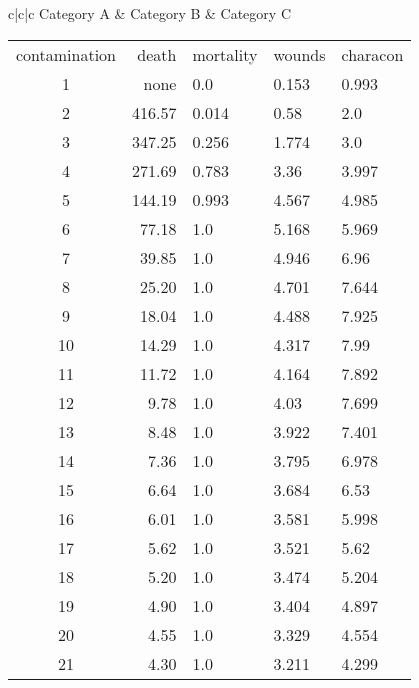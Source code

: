 \documentclass{article}
\begin{document}
    \begin{tabular}{c|c|c}
        Category A & Category B & Category C\\
        \begin{tabular}{c|rlll}
            contamination & death & mortality & wounds& characon\\
            1              &none   	&0.0        &0.153    &0.993    \\
            2              &416.57 	&0.014      &0.58     &2.0      \\
            3              &347.25 	&0.256      &1.774    &3.0      \\
            4              &271.69 	&0.783      &3.36     &3.997    \\
            5              &144.19 	&0.993      &4.567    &4.985    \\
            6              & 77.18 	&1.0        &5.168    &5.969    \\
            7              & 39.85 	&1.0        &4.946    &6.96     \\
            8              & 25.20 	&1.0        &4.701    &7.644    \\
            9              & 18.04 	&1.0        &4.488    &7.925    \\
            10             & 14.29 	&1.0        &4.317    &7.99     \\
            11             & 11.72 	&1.0        &4.164    &7.892    \\
            12             &  9.78 	&1.0        &4.03     &7.699    \\
            13             &  8.48 	&1.0        &3.922    &7.401    \\
            14             &  7.36 	&1.0        &3.795    &6.978    \\
            15             &  6.64 	&1.0        &3.684    &6.53     \\
            16             &  6.01 	&1.0        &3.581    &5.998    \\
            17             &  5.62 	&1.0        &3.521    &5.62     \\
            18             &  5.20 	&1.0        &3.474    &5.204    \\
            19             &  4.90 	&1.0        &3.404    &4.897    \\
            20             &  4.55 	&1.0        &3.329    &4.554    \\
            21             &  4.30 	&1.0        &3.211    &4.299    \\

\end{tabular}
\end{tabular}
\end{document}
